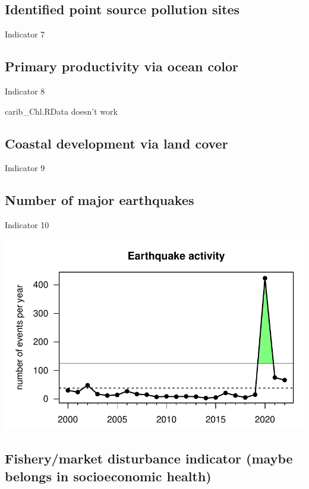 \documentclass[
  letterpaper,
  oneside,
  open=any]{scrbook}
\begin{document}
\hypertarget{identified-point-source-pollution-sites}{%
\subsection{Identified point source pollution
sites}\label{identified-point-source-pollution-sites}}

Indicator 7

\hypertarget{primary-productivity-via-ocean-color}{%
\subsection{Primary productivity via ocean
color}\label{primary-productivity-via-ocean-color}}

Indicator 8

carib\_Chl.RData doesn't work

\hypertarget{coastal-development-via-land-cover}{%
\subsection{Coastal development via land
cover}\label{coastal-development-via-land-cover}}

Indicator 9

\hypertarget{number-of-major-earthquakes}{%
\subsection{Number of major
earthquakes}\label{number-of-major-earthquakes}}

Indicator 10

\includegraphics{Report_book_files/Risk_indicators_files/figure-pdf/unnamed-chunk-6-1.pdf}

\hypertarget{fisherymarket-disturbance-indicator-maybe-belongs-in-socioeconomic-health}{%
\subsection{Fishery/market disturbance indicator (maybe belongs in
socioeconomic
health)}\label{fisherymarket-disturbance-indicator-maybe-belongs-in-socioeconomic-health}}
\end{document}

